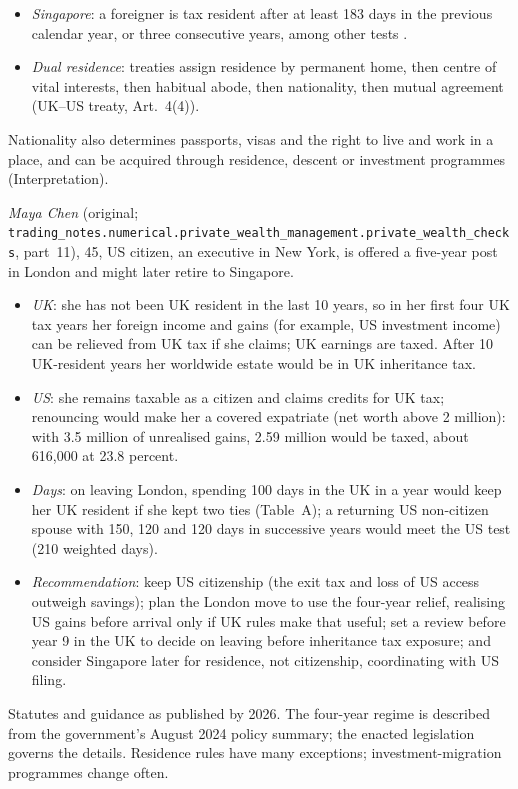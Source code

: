 \begin{qfmethod}
\begin{itemize}
\item \emph{Singapore}: a foreigner is tax resident after at least 183 days in the previous calendar year, or three consecutive years, among other tests \citep[residency rules]{iras-tax-residency-2026}.
\item \emph{Dual residence}: treaties assign residence by permanent home, then centre of vital interests, then habitual abode, then nationality, then mutual agreement (UK--US treaty, Art.~4(4)).
\end{itemize}
Nationality also determines passports, visas and the right to live and work in a place, and can be acquired through residence, descent or investment programmes (Interpretation).

 \emph{Maya Chen} (original; \nolinkurl{trading_notes.numerical.private_wealth_management.private_wealth_checks}, part~11), 45, US citizen, an executive in New York, is offered a five-year post in London and might later retire to Singapore.
\begin{itemize}
\item \emph{UK}: she has not been UK resident in the last 10 years, so in her first four UK tax years her foreign income and gains (for example, US investment income) can be relieved from UK tax if she claims; UK earnings are taxed. After 10 UK-resident years her worldwide estate would be in UK inheritance tax.
\item \emph{US}: she remains taxable as a citizen and claims credits for UK tax; renouncing would make her a covered expatriate (net worth above 2 million): with 3.5 million of unrealised gains, 2.59 million would be taxed, about 616,000 at 23.8 percent.
\item \emph{Days}: on leaving London, spending 100 days in the UK in a year would keep her UK resident if she kept two ties (Table~A); a returning US non-citizen spouse with 150, 120 and 120 days in successive years would meet the US test (210 weighted days).
\item \emph{Recommendation}: keep US citizenship (the exit tax and loss of US access outweigh savings); plan the London move to use the four-year relief, realising US gains before arrival only if UK rules make that useful; set a review before year 9 in the UK to decide on leaving before inheritance tax exposure; and consider Singapore later for residence, not citizenship, coordinating with US filing.
\end{itemize}

 Statutes and guidance as published by 2026. The four-year regime is described from the government's August 2024 policy summary; the enacted legislation governs the details. Residence rules have many exceptions; investment-migration programmes change often.


\end{qfmethod}
